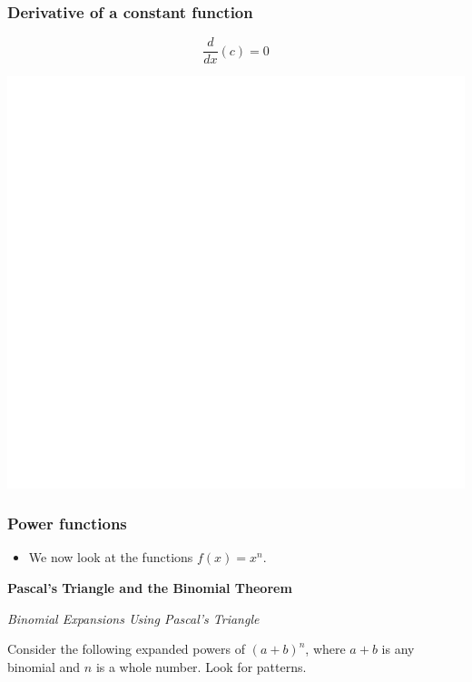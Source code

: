 \documentclass[]{book}
\providecommand{\tightlist}{%
  \setlength{\itemsep}{0pt}\setlength{\parskip}{0pt}}
\begin{document}
\hypertarget{derivative-of-a-constant-function}{%
\subsubsection{Derivative of a constant function}\label{derivative-of-a-constant-function}}

\[\frac{d}{dx}(c) = 0\]

\begin{center}\includegraphics[width=1\linewidth]{figure/LB2-1} \end{center}

\hypertarget{power-functions}{%
\subsubsection{Power functions}\label{power-functions}}

\begin{itemize}
\tightlist
\item
  We now look at the functions \(f(x) = x^n\).
\end{itemize}

\textbf{Pascal's Triangle and the Binomial Theorem}

\emph{Binomial Expansions Using Pascal's Triangle}

Consider the following expanded powers of \((a + b)^n\), where \(a + b\) is any binomial and \(n\) is a whole number. Look for patterns.
\end{document}

